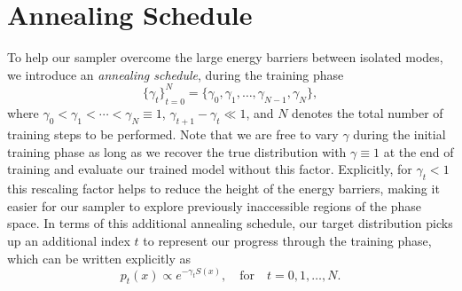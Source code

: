 \documentclass{article} %
\begin{document}
{\section{\label{sec:annealing_schedule}Annealing Schedule}
%
To help our sampler overcome the large energy barriers between isolated modes, we introduce an \emph{annealing
schedule}, during the training phase
%
\begin{equation}
   {\{\gamma_{t}\}}_{t=0}^{N} = \{\gamma_{0}, \gamma_{1}, \ldots, \gamma_{N-1}, \gamma_{N}\},
\end{equation}
%
where \(\gamma_{0} < \gamma_{1} < \cdots < \gamma_{N} \equiv 1\), \(\gamma_{t+1} - \gamma_{t} \ll 1\), and \(N\) denotes the
total number of training steps to be performed.
%
Note that we are free to vary \(\gamma\) during the initial training phase as long as we recover the true distribution
with \(\gamma \equiv 1\) at the end of training and evaluate our trained model without this factor.
%
Explicitly, for \(\gamma_{t} < 1\) this rescaling factor helps to reduce the height of the energy barriers, making it
easier for our sampler to explore previously inaccessible regions of the phase space.
%
In terms of this additional annealing schedule, our target distribution picks up an additional index \(t\) to represent
our progress through the training phase, which can be written explicitly as  
%
\begin{equation}
   p_{t}(x)\propto e^{-\gamma_{t} S(x)}, \quad\text{for}\quad t = 0, 1, \ldots, N.
\end{equation}
%

}
\end{document}

